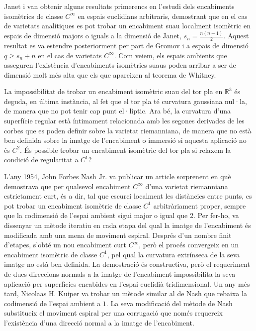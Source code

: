 Janet i \cite{cartan1927} van obtenir alguns resultats primerencs en l'estudi dels encabiments isomètrics de classe $C^\infty$ en espais euclidians arbitraris, demostrant que en el cas de varietats analítiques es pot trobar un encabiment suau localment isomètric en espais de dimensió majors o iguals a la dimensió de Janet, $s_n = \frac{n(n+1)}{2}$. Aquest resultat es va estendre posteriorment per part de Gromov i \cite{rokhlin1970} a espais de dimensió $q\ge s_n+n$ en el cas de varietats $C^\infty$. Com veiem, els espais ambients que asseguren l'existència d'encabiments isomètrics suaus poden arribar a ser de dimensió molt més alta que els que apareixen al teorema de Whitney.

La impossibilitat de trobar un encabiment isomètric suau del tor pla en $\mathbb R^3$ és deguda, en última instància, al fet que el tor pla té curvatura gaussiana nul·la, de manera que no pot tenir cap punt el·líptic. Ara bé, la curvatura d'una superfície regular està íntimament relacionada amb les segones derivades de les corbes que es poden definir sobre la varietat riemanniana, de manera que no està ben definida sobre la imatge de l'encabiment o immersió si aquesta aplicació no és $C^2$. És possible trobar un encabiment isomètric del tor pla si relaxem la condició de regularitat a $C^1$?

L'any 1954, John Forbes Nash Jr. va publicar un article sorprenent en què demostrava que per qualsevol encabiment $C^\infty$ d'una varietat riemanniana estrictament curt, és a dir, tal que escurci localment les distàncies entre punts, es pot trobar un encabiment isomètric de classe $C^1$ arbitràriament proper, sempre que la codimensió de l'espai ambient sigui major o igual que 2. Per fer-ho, va dissenyar un mètode iteratiu en cada etapa del qual la imatge de l'encabiment és modificada amb una mena de moviment espiral. Després d'un nombre finit d'etapes, s'obté un nou encabiment curt $C^\infty$, però el procés convergeix en un encabiment isomètric de classe $C^1$, pel qual la curvatura extrínseca de la seva imatge no està ben definida. La demostració és constructiva, però el requeriment de dues direccions normals a la imatge de l'encabiment impossibilita la seva aplicació per superfícies encabides en l'espai euclidià tridimensional. Un any més tard, Nicolaas H. Kuiper va trobar un mètode similar al de Nash que rebaixa la codimensió de l'espai ambient a $1$. La seva modificació del mètode de Nash substitueix el moviment espiral per una corrugació que només requereix l'existència d'una direcció normal a la imatge de l'encabiment.

